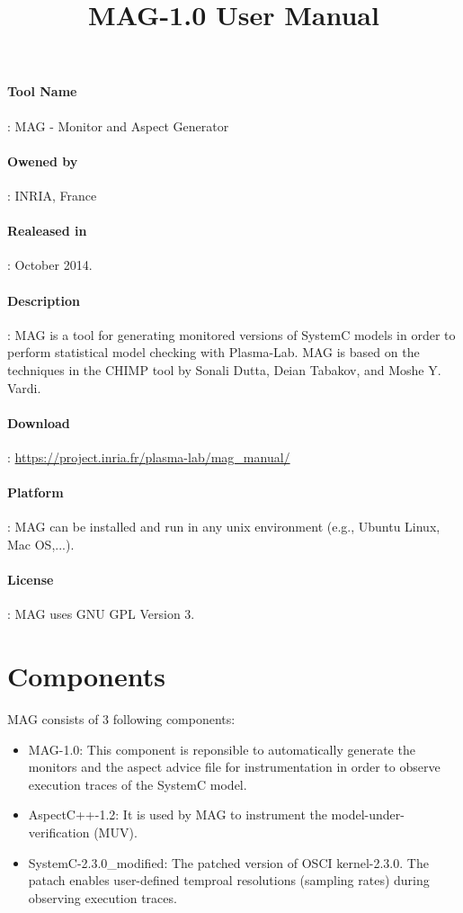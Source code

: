 \documentclass{llncs}
\begin{document}
\mainmatter
\title{MAG-1.0 User Manual}

\author{}
\maketitle
\paragraph{\textbf{Tool Name}}: MAG - Monitor and Aspect Generator
\paragraph{\textbf{Owened by}}: INRIA, France
\paragraph{\textbf{Realeased in}}: October 2014.
\paragraph{\textbf{Description}}: MAG is a tool for generating monitored versions of SystemC models in order to perform statistical model checking with Plasma-Lab. MAG is based on the techniques in the CHIMP tool by Sonali Dutta, Deian Tabakov, and Moshe Y. Vardi.
\paragraph{\textbf{Download}}: \url{https://project.inria.fr/plasma-lab/mag_manual/}
\paragraph{\textbf{Platform}}: MAG can be installed and run in any unix environment (e.g., Ubuntu Linux, Mac OS,...).
\paragraph{\textbf{License}}: MAG uses GNU GPL Version 3.
\section{Components}
MAG consists of 3 following components:
\begin{itemize}
\item MAG-1.0: This component is reponsible to automatically generate the monitors and the aspect advice file for instrumentation in order to observe execution traces of the SystemC model.
\item AspectC++-1.2: It is used by MAG to instrument the model-under-verification (MUV).
\item SystemC-2.3.0\_modified: The patched version of OSCI kernel-2.3.0. The patach enables user-defined temproal resolutions (sampling rates) during observing execution traces.
\end{itemize}
\end{document}
